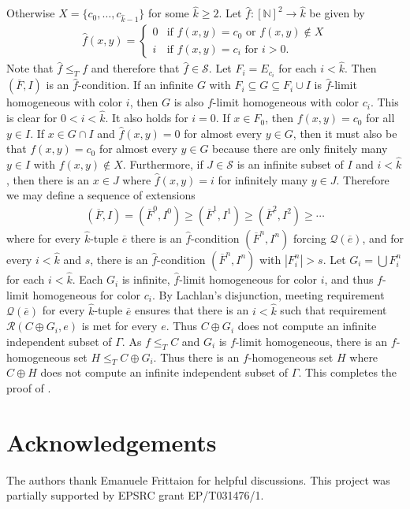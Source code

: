 \documentclass{article}
\def\Q{\mathcal{Q}}
\def\R{\mathcal{R}}
\def\Sc{\mathcal{S}}
\def\Q{\mathcal{Q}}
\newcommand{\NN}[0]{\mathbb{N}}
\newcommand{\ol}[1]{\overline{#1}}
\numberwithin{theorem}{section}
\begin{document}
Otherwise $X = \{c_0, \dots, c_{\hat{k}-1} \}$ for some $\hat{k} \geq 2$.  Let $\hat{f} : [\NN]^2 \to \hat{k}$ be given by
\begin{align*}
\hat{f}(x,y) =
\begin{cases}
0 & \text{if $f(x,y) = c_0$ or $f(x,y) \notin X$}\\
i & \text{if $f(x,y) = c_i$ for $i > 0$.}
\end{cases}
\end{align*}
Note that $\hat{f} \leq_T f$ and therefore that $\hat{f} \in \Sc$.  Let $F_i = E_{c_i}$ for each $i < \hat{k}$.  Then $(\ol{F}, I)$ is an $\hat{f}$-condition.  If an infinite $G$ with $F_i \subseteq G \subseteq F_i \cup I$ is $\hat{f}$-limit homogeneous with color $i$, then $G$ is also $f$-limit homogeneous with color $c_i$.  This is clear for $0 < i < \hat{k}$.  It also holds for $i = 0$.  If $x \in F_0$, then $f(x,y) = c_0$ for all $y \in I$.  If $x \in G \cap I$ and $\hat{f}(x,y) = 0$ for almost every $y \in G$, then it must also be that $f(x,y) = c_0$ for almost every $y \in G$ because there are only finitely many $y \in I$ with $f(x,y) \notin X$.  Furthermore, if $J \in \Sc$ is an infinite subset of $I$ and $i < \hat{k}$, then there is an $x \in J$ where $\hat{f}(x,y) = i$ for infinitely many $y \in J$.  Therefore we may define a sequence of extensions
\begin{align*}
(\ol{F}, I) = (\ol{F}^0, I^0) \geq (\ol{F}^1, I^1) \geq (\ol{F}^2, I^2) \geq \cdots
\end{align*}
where for every $\hat{k}$-tuple $\ol{e}$ there is an $\hat{f}$-condition $(\ol{F}^n, I^n)$ forcing $\Q(\ol{e})$, and for every $i < \hat{k}$ and $s$, there is an $\hat{f}$-condition $(\ol{F}^n, I^n)$ with $|F^n_i| > s$.  Let $G_i = \bigcup F^n_i$ for each $i < \hat{k}$.  Each $G_i$ is infinite, $\hat{f}$-limit homogeneous for color $i$, and thus $f$-limit homogeneous for color $c_i$.  By Lachlan's disjunction, meeting requirement $\Q(\ol{e})$ for every $\hat{k}$-tuple $\ol{e}$ ensures that there is an $i < \hat{k}$ such that requirement $\R(C \oplus G_i, e)$ is met for every $e$.  Thus $C \oplus G_i$ does not compute an infinite independent subset of $\Gamma$.  As $f \leq_T C$ and $G_i$ is $f$-limit homogeneous, there is an $f$-homogeneous set $H \leq_T C \oplus G_i$.  Thus there is an $f$-homogeneous set $H$ where $C \oplus H$ does not compute an infinite independent subset of $\Gamma$.  This completes the proof of .

\section*{Acknowledgements}
The authors thank Emanuele Frittaion for helpful discussions.  This project was partially supported by EPSRC grant EP/T031476/1.




\end{document}
